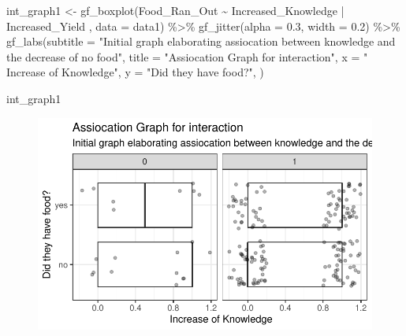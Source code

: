 \documentclass[
  letterpaper,
  DIV=11,
  numbers=noendperiod]{scrartcl}
\newenvironment{Shaded}{\begin{snugshade}}{\end{snugshade}}
\newcommand{\AttributeTok}[1]{\textcolor[rgb]{0.40,0.45,0.13}{#1}}
\newcommand{\FloatTok}[1]{\textcolor[rgb]{0.68,0.00,0.00}{#1}}
\newcommand{\FunctionTok}[1]{\textcolor[rgb]{0.28,0.35,0.67}{#1}}
\newcommand{\NormalTok}[1]{\textcolor[rgb]{0.00,0.23,0.31}{#1}}
\newcommand{\OtherTok}[1]{\textcolor[rgb]{0.00,0.23,0.31}{#1}}
\newcommand{\SpecialCharTok}[1]{\textcolor[rgb]{0.37,0.37,0.37}{#1}}
\newcommand{\StringTok}[1]{\textcolor[rgb]{0.13,0.47,0.30}{#1}}
\begin{document}
\begin{Shaded}
\begin{Highlighting}[]
\NormalTok{int\_graph1 }\OtherTok{\textless{}{-}} \FunctionTok{gf\_boxplot}\NormalTok{(Food\_Ran\_Out }\SpecialCharTok{\textasciitilde{}}\NormalTok{ Increased\_Knowledge }\SpecialCharTok{|}\NormalTok{ Increased\_Yield ,  }\AttributeTok{data =}\NormalTok{ data1) }\SpecialCharTok{\%\textgreater{}\%}
  \FunctionTok{gf\_jitter}\NormalTok{(}\AttributeTok{alpha =} \FloatTok{0.3}\NormalTok{, }\AttributeTok{width =} \FloatTok{0.2}\NormalTok{) }\SpecialCharTok{\%\textgreater{}\%}
   \FunctionTok{gf\_labs}\NormalTok{(}\AttributeTok{subtitle =} \StringTok{"Initial graph elaborating assiocation between knowledge and the decrease of no food"}\NormalTok{,}
          \AttributeTok{title =} \StringTok{"Assiocation Graph for interaction"}\NormalTok{,}
          \AttributeTok{x =} \StringTok{" Increase of Knowledge"}\NormalTok{,}
          \AttributeTok{y =} \StringTok{"Did they have food?"}\NormalTok{, }
\NormalTok{           )}

\NormalTok{int\_graph1}
\end{Highlighting}
\end{Shaded}

\begin{figure}[H]

{\centering \includegraphics{Empircal-Research-final_files/figure-pdf/unnamed-chunk-2-1.pdf}

}

\end{figure}
\end{document}
